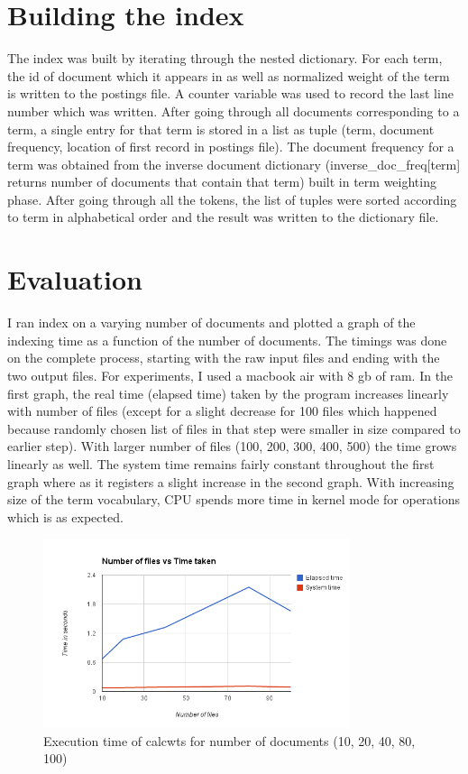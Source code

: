 \documentclass[paper=a4, fontsize=11pt]{scrartcl}
\numberwithin{equation}{section}		%
\numberwithin{figure}{section}			%
\numberwithin{table}{section}				%
\begin{document}
\section{Building the index}

The index was built by iterating through the nested dictionary. For each term, the id of document which it appears in as well as normalized weight of the term is written to the postings file. A counter variable was used to record the last line number which was written. After going through all documents corresponding to a term, a single entry for that term is stored in a list as tuple (term, document frequency, location of first record in postings file). The document frequency for a term was obtained from the inverse document dictionary (inverse\_doc\_freq[term] returns number of documents that contain that term) built in term weighting phase. After going through all the tokens, the list of tuples were sorted according to term in alphabetical order and the result was written to the dictionary file.      

\section{Evaluation}

I ran index on a varying number of documents and plotted a graph of the indexing time as a function of the number of documents. The timings was done on the complete process, starting with the raw input files and ending with the two output files. For experiments, I used a macbook air with 8 gb of ram. In the first graph, the real time (elapsed time) taken by the program increases linearly with number of files (except for a slight decrease for 100 files which happened because randomly chosen list of files in that step were smaller in size compared to earlier step). With larger number of files (100, 200, 300, 400, 500) the time grows linearly  as well. The system time remains fairly constant throughout the first graph where as it registers a slight increase in the second graph. With increasing size of the term vocabulary, CPU spends more time in kernel mode for operations which is as expected. 

\begin{figure}[h] %
  \begin{center}
    \includegraphics[width=0.8\textwidth]{time_1.png}
  \end{center}
  \caption{Execution time of calcwts for number of documents (10, 20, 40, 80, 100)}
\end{figure}
\end{document}
